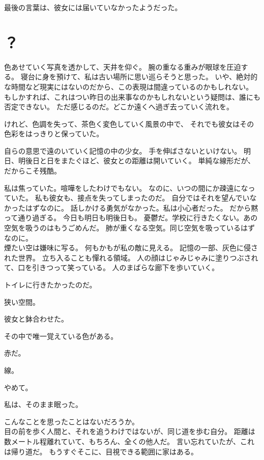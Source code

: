 \documentclass[../IHMain]{subfiles}
\begin{document}
最後の言葉は、彼女には届いていなかったようだった。

\newpage

\section*{？}
色あせていく写真を透かして、天井を仰ぐ。
腕の重なる重みが眼球を圧迫する。
寝台に身を預けて、私は古い場所に思い巡らそうと思った。
いや、絶対的な時間など現実にはないのだから、この表現は間違っているのかもしれない。
もしかすれば、これはつい昨日の出来事なのかもしれないという疑問は、誰にも否定できない。
ただ感じるのだ。どこか遠くへ過ぎ去っていく流れを。

けれど、色調を失って、茶色く変色していく風景の中で、
それでも彼女はその色彩をはっきりと保っていた。

自らの意思で遠のいていく記憶の中の少女。
手を伸ばさないといけない。
明日、明後日と日をまたぐほど、彼女との距離は開いていく。
単純な線形だが、だからこそ残酷。

私は焦っていた。喧嘩をしたわけでもない。
なのに、いつの間にか疎遠になっていた。
私も彼女も、接点を失ってしまったのだ。
自分ではそれを望んでいなかったはずなのに。
話しかける勇気がなかった。私は小心者だった。
だから黙って通り過ぎる。
今日も明日も明後日も。
憂鬱だ。学校に行きたくない。あの空気を吸うのはもうごめんだ。
肺が重くなる空気。同じ空気を吸っているはずなのに。\\

煙たい空は嫌味に写る。
何もかもが私の敵に見える。
記憶の一部、灰色に侵された世界。
立ち入ることも憚れる領域。
人の顔はじゃみじゃみに塗りつぶされて、口を引きつって笑っている。
人のまばらな廊下を歩いていく。

トイレに行きたかったのだ。

狭い空間。

彼女と鉢合わせた。

その中で唯一覚えている色がある。

赤だ。

線。

やめて。

私は、そのまま眠った。

\newpage
\onecolumn
\markboth{}{}

こんなことを思ったことはないだろうか。\\

目の前を歩く人間と、それを追うわけではないが、同じ道を歩む自分。
距離は数メートル程離れていて、もちろん、全くの他人だ。
言い忘れていたが、これは帰り道だ。
もうすぐそこに、目視できる範囲に家はある。
\end{document}
